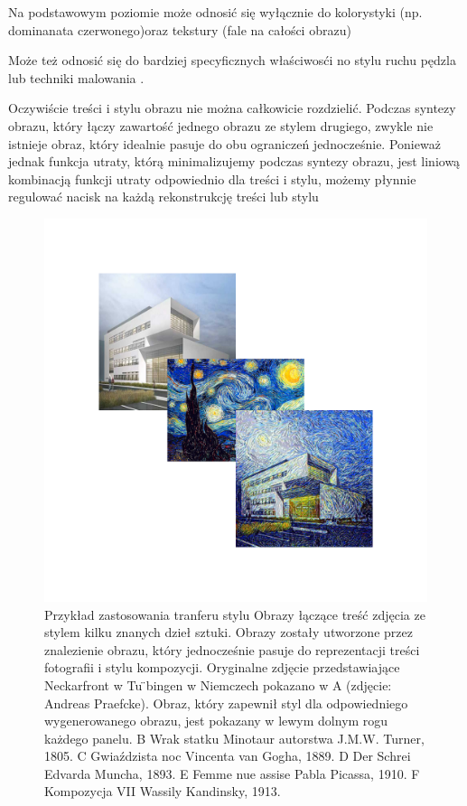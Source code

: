\documentclass[brudnopis]{xmgr}
\begin{document}
Na podstawowym poziomie może odnosić się wyłącznie do kolorystyki (np. dominanata czerwonego)oraz tekstury (fale na całości obrazu)


Może też odnosić się do bardziej specyficznych właściwosći no stylu ruchu pędzla lub techniki malowania .


Oczywiście treści i stylu obrazu nie można całkowicie rozdzielić. Podczas syntezy obrazu, który łączy zawartość jednego obrazu ze stylem drugiego, zwykle nie istnieje obraz, który idealnie pasuje do obu ograniczeń jednocześnie. Ponieważ jednak funkcja utraty, którą minimalizujemy podczas syntezy obrazu, jest liniową kombinacją funkcji utraty odpowiednio dla treści i stylu, możemy płynnie regulować nacisk na każdą rekonstrukcję treści lub stylu

 \begin{figure}[!tbh]
\centering
\includegraphics[width=.8\hsize]{fig/6}
\caption{Przykład zastosowania tranferu stylu
Obrazy łączące treść zdjęcia ze stylem kilku znanych dzieł sztuki. Obrazy zostały utworzone przez znalezienie obrazu, który jednocześnie pasuje do reprezentacji treści fotografii i stylu kompozycji. Oryginalne zdjęcie przedstawiające Neckarfront w Tu ̈bingen w Niemczech pokazano w A (zdjęcie: Andreas Praefcke). Obraz, który zapewnił styl dla odpowiedniego wygenerowanego obrazu, jest pokazany w lewym dolnym rogu każdego panelu. B Wrak statku Minotaur autorstwa J.M.W. Turner, 1805. C Gwiaździsta noc Vincenta van Gogha, 1889. D Der Schrei Edvarda Muncha, 1893. E Femme nue assise Pabla Picassa, 1910. F Kompozycja VII Wassily Kandinsky, 1913.
\label{RYS.6}}
\end{figure}
\end{document}
